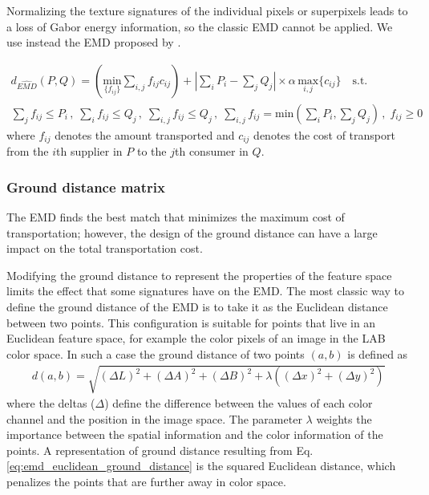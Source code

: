 Normalizing the texture signatures of the individual pixels or superpixels leads to a loss of Gabor energy information, so the classic EMD cannot be applied. We use instead the EMD proposed by \citep{Pele.Werman::2008}.

\begin{eqnarray}
d_{\widehat{EMD}}(P, Q) = \left( \underset{\{f_{ij}\}}{\mathrm{min}}\sum_{i,j}f_{ij}c_{ij}\right)
+ \left\vert \sum_{i} P_i - \sum_{j} Q_j \right\vert \times \alpha\, \underset{{i,j}}{\mathrm{max}} \{c_{ij}\}  \quad \text{s.t.}\label{eq:emd_pele} \\
\sum_{j}f_{ij} \leq P_i \, , \; \sum_{i}f_{ij} \leq Q_j \, , \; \sum_{i,j}f_{ij} \leq Q_j \, , \; \sum_{i,j}f_{ij} = \mathrm{min} \left( \sum_{i} P_i , \sum_{j} Q_j\right)\, , \; f_{ij} \geq 0
\end{eqnarray}
where $f_{ij}$ denotes the amount transported and $c_{ij}$ denotes the cost of transport from the $i$th supplier in $P$ to the $j$th consumer in $Q$. 


\subsubsection{Ground distance matrix}
The EMD finds the best match that minimizes the maximum cost of transportation; however, the design of the ground distance can have a large impact on the total transportation cost.

Modifying the ground distance to represent the properties of the feature space limits the effect that some signatures have on the EMD. The most classic way to define the ground distance of the EMD is to take it as the Euclidean distance between two points. This configuration is suitable for points that live in an Euclidean feature space, for example the color pixels of an image in the LAB color space. In such a case the ground distance of two points $(a,b)$ is defined as
\begin{eqnarray} \label{eq:emd_euclidean_ground_distance}
	d(a, b) = \sqrt{(\Delta L)^2 + (\Delta A)^2 + (\Delta B)^2 + \lambda((\Delta x)^2 +(\Delta y)^2) } 	
\end{eqnarray}
where the deltas ($\Delta$) define the difference between the values of each color channel and the position in the image space. The parameter $\lambda$ weights the importance between the spatial information and the color information of the points. A representation of ground distance resulting from Eq. \eqref{eq:emd_euclidean_ground_distance} is the squared Euclidean distance, which penalizes the points that are further away in color space. 


